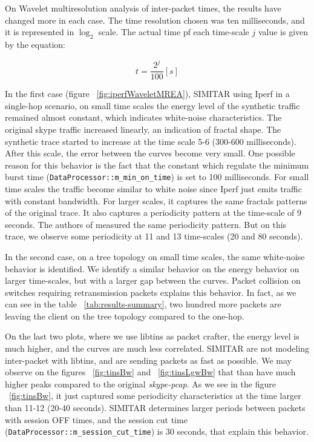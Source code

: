 On Wavelet multiresolution analysis of inter-packet times, the results have changed more in each case. The time resolution chosen was ten milliseconds, and it is represented in $\log_2$ scale. The actual time pf each time-scale $j$ value is given by the equation:

\begin{equation}
t = \frac{2^{j}}{100} [s]
\end{equation}

In the first case (figure ~\ref{fig:iperfWaveletMREA}), SIMITAR using Iperf in a single-hop scenario, on small time scales the energy level of the synthetic traffic remained almost constant, which indicates white-noise characteristics. The original skype traffic increased linearly, an indication of fractal shape. The synthetic trace started to increase at the time scale 5-6 (300-600 milliseconds). After this scale, the error between the curves become very small. One possible reason for this behavior is the fact that the constant which regulate the minimum burst time (\texttt{DataProcessor::m\_min\_on\_time}) is set to 100 milliseconds. For small time scales the traffic become similar to white noise since Iperf just emits traffic with constant bandwidth. For larger scales, it captures the same fractals patterns of the original trace. It also captures a periodicity pattern at the time-scale of 9 seconds. The authors of \cite{swing-paper} measured the same periodicity pattern. But on this trace, we observe some periodicity at 11 and 13 time-scales (20 and 80 seconds). 

In the second case, on a tree topology on small time scales, the same white-noise behavior is identified. We identify a similar behavior on the energy behavior on larger time-scales, but with a larger gap between the curves. Packet collision on switches requiring retransmission packets explains this behavior. In fact, as we can see in the table ~\ref{tab:results-summary}, two hundred more packets are leaving the client on the tree topology compared to the one-hop. 

On the last two plots, where we use libtins as packet crafter, the energy level is much higher, and the curves are much less correlated. SIMITAR are not modeling inter-packet with libtins, and are sending packets as fast as possible. We may observe on the figures ~\ref{fig:tinsBw} and ~\ref{fig:tinsLgwBw} that than have much  higher peaks compared to the original \textit{skype-pcap}.  As we see in the figure ~\ref{fig:tinsBw}, it just captured some periodicity characteristics at the time larger than 11-12 (20-40 seconds). SIMITAR determines larger periods between packets with session OFF times, and the session cut time (\texttt{DataProcessor::m\_session\_cut\_time}) is 30 seconds, that explain this behavior.


